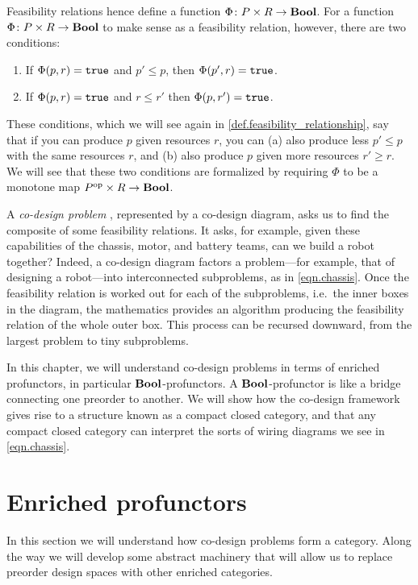 \documentclass[7Sketches]{subfiles}
\begin{document}
Feasibility relations hence define a function $\Phi\colon P \times R \to \mathbf{Bool}$.
For a function $\Phi\colon P\times R\to\mathbf{Bool}$ to make sense as a feasibility
relation, however, there are two conditions:
\begin{enumerate}[label=(\alph*)]
	\item If $\Phi(p,r)=\mathtt{true}$ and $p' \le p$, then $\Phi(p',r)=\mathtt{true}$.
	\item If $\Phi(p,r)=\mathtt{true}$ and $r \le r'$ then $\Phi(p,r')=\mathtt{true}$.
\end{enumerate}
These conditions, which we will see again in
\cref{def.feasibility_relationship}, say that if you can produce $p$ given
resources $r$, you can (a) also produce less $p'\leq p$ with the same resources
$r$, and (b) also produce $p$ given more resources $r'\geq r$. We will see that
these two conditions are formalized by requiring $\Phi$ to be a monotone map
$P^{\textnormal{op}}\times R\to\mathbf{Bool}$.%

A \emph{co-design problem}%
, represented by a co-design
diagram, asks us to find the composite of some feasibility relations. It asks,
for example, given these capabilities of the chassis, motor, and battery teams,
can we build a robot together? Indeed, a co-design diagram factors a
problem---for example, that of designing a robot---into interconnected
subproblems, as in \cref{eqn.chassis}.  Once the feasibility relation is worked
out for each of the subproblems, i.e.\ the inner boxes in the diagram, the
mathematics provides an algorithm producing the feasibility relation of the
whole outer box. This process can be recursed downward, from the largest problem
to tiny subproblems. 

In this chapter, we will understand co-design problems in terms of enriched
profunctors, in particular $\mathbf{Bool}$-profunctors. A $\mathbf{Bool}$-profunctor is like a
bridge connecting one preorder to another. We will show how the co-design framework
gives rise to a structure known as a compact closed category, and that any
compact closed category can interpret the sorts of wiring diagrams we see in
\cref{eqn.chassis}. 

\section{Enriched profunctors}%

In this section we will understand how co-design problems form a category. Along
the way we will develop some abstract machinery that will allow us to replace
preorder design spaces with other enriched categories.
\end{document}

